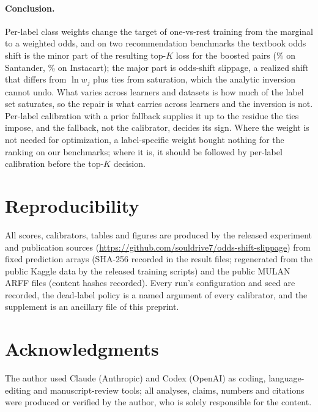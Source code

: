 \documentclass[sigconf,nonacm]{acmart}
\begin{document}
\paragraph{Conclusion.} Per-label class weights change the target of one-vs-rest training from the marginal to a weighted odds, and on two recommendation benchmarks the textbook odds shift is the minor part of the resulting top-$K$ loss for the boosted pairs (\noddsShare\% on Santander, \nIoddsShare\% on Instacart); the major part is odds-shift slippage, a realized shift that differs from $\ln w_j$ plus ties from saturation, which the analytic inversion cannot undo. What varies across learners and datasets is how much of the label set saturates, so the repair is what carries across learners and the inversion is not. Per-label calibration with a prior fallback supplies it up to the residue the ties impose, and the fallback, not the calibrator, decides its sign. Where the weight is not needed for optimization, a label-specific weight bought nothing for the ranking on our benchmarks; where it is, it should be followed by per-label calibration before the top-$K$ decision.

\section*{Reproducibility}
All scores, calibrators, tables and figures are produced by the released experiment and publication sources (\url{https://github.com/souldrive7/odds-shift-slippage}) from fixed prediction arrays (SHA-256 recorded in the result files; regenerated from the public Kaggle data by the released training scripts) and the public MULAN ARFF files (content hashes recorded). Every run's configuration and seed are recorded, the dead-label policy is a named argument of every calibrator, and the supplement is an ancillary file of this preprint.

\section*{Acknowledgments}
The author used Claude (Anthropic) and Codex (OpenAI) as coding, language-editing and manuscript-review tools; all analyses, claims, numbers and citations were produced or verified by the author, who is solely responsible for the content.



\end{document}
